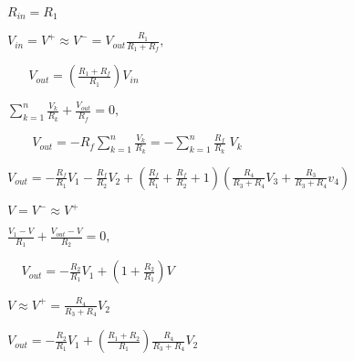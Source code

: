 \documentclass{article}
\def\lthtmlcheckvsize{\ifdim\ht\sizebox<\vsize 
  \ifdim\wd\sizebox<\hsize\expandafter\hfill\fi \expandafter\vfill
  \else\expandafter\vss\fi}%
\begin{document}
{\newpage\clearpage
{}%
$ R_{in}=R_1$%
\lthtmlindisplaymathZ
\lthtmlcheckvsize\clearpage}

{\newpage\clearpage
{}%
$\displaystyle V_{in}=V^+\approx V^-=V_{out}\frac{R_1}{R_1+R_f},\;\;\;\;$%
\lthtmlindisplaymathZ
\lthtmlcheckvsize\clearpage}

{\newpage\clearpage
{}%
$\displaystyle \;\;\;\;\;\;
V_{out}=\left(\frac{R_1+R_f}{R_1}\right)V_{in}$%
\lthtmlindisplaymathZ
\lthtmlcheckvsize\clearpage}

{\newpage\clearpage
{}%
$\displaystyle \sum_{k=1}^n \frac{V_k}{R_k}+\frac{V_{out}}{R_f}=0,\;\;\;\;\;\;\;$%
\lthtmlindisplaymathZ
\lthtmlcheckvsize\clearpage}

{\newpage\clearpage
{}%
$\displaystyle \;\;\;\;\;\;\;V_{out}=-R_f \sum_{k=1}^n \frac{V_k}{R_k}
=- \sum_{k=1}^n \frac{R_f}{R_k} \;V_k$%
\lthtmlindisplaymathZ
\lthtmlcheckvsize\clearpage}

{\newpage\clearpage
{}%
$\displaystyle V_{out}=-\frac{R_f}{R_1}V_1-\frac{R_f}{R_2}V_2
+\left(\frac{R_f}{R_1}+\frac{R_f}{R_2}+1\right)
\left(\frac{R_4}{R_3+R_4} V_3+\frac{R_3}{R_3+R_4} v_4\right)$%
\lthtmlindisplaymathZ
\lthtmlcheckvsize\clearpage}

{\newpage\clearpage
{}%
$ V=V^-\approx V^+$%
\lthtmlindisplaymathZ
\lthtmlcheckvsize\clearpage}

{\newpage\clearpage
{}%
$\displaystyle \frac{V_1-V}{R_1}+\frac{V_{out}-V}{R_2}=0,\;\;\;\;$%
\lthtmlindisplaymathZ
\lthtmlcheckvsize\clearpage}

{\newpage\clearpage
{}%
$\displaystyle \;\;\;\;
V_{out}=-\frac{R_2}{R_1}V_1+\left(1+\frac{R_2}{R_1}\right) V$%
\lthtmlindisplaymathZ
\lthtmlcheckvsize\clearpage}

{\newpage\clearpage
{}%
$\displaystyle V\approx V^+=\frac{R_4}{R_3+R_4}V_2$%
\lthtmlindisplaymathZ
\lthtmlcheckvsize\clearpage}

{\newpage\clearpage
{}%
$\displaystyle V_{out}=-\frac{R_2}{R_1}V_1+\left(\frac{R_1+R_2}{R_1}\right)\frac{R_4}{R_3+R_4}V_2$%
\lthtmlindisplaymathZ
\lthtmlcheckvsize\clearpage}
\end{document}
